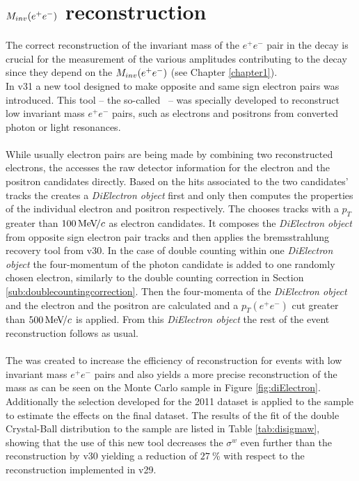 \section{$M_{inv}(e^+e^-)$ reconstruction}
\label{sec:DiElectronMaker}
The correct reconstruction of the invariant mass of the $e^+ e^-$ pair in the \BdKstee decay is crucial for the measurement of the various amplitudes contributing to the decay since they depend on the $M_{inv}(e^+e^-)$ (see Chapter \ref{chapter1}).\\
In \davinci v31 a new tool designed to make opposite and same sign electron pairs was introduced. This tool -- the so-called \dielectronmaker  \ -- was specially developed to reconstruct low invariant mass $e^+ e^-$ pairs, such as electrons and positrons from converted photon or light resonances.\\
\\
While usually electron pairs are being made by combining two reconstructed electrons, the \dielectronmaker accesses the raw detector information for the electron and the positron candidates directly. Based on the hits associated to the two candidates' tracks the \dielectronmaker creates a \textit{DiElectron object} first and only then computes the properties of the individual electron and positron respectively. The \dielectronmaker chooses tracks with a $p_T$ greater than $100 {\mathrm{\,Me\kern -0.1em V\!/}c}$ as electron candidates. It composes the \textit{DiElectron object} from opposite sign electron pair tracks and then applies the bremsstrahlung recovery tool from \davinci v30. In the case of double counting within one \textit{DiElectron object} the four-momentum of the photon candidate is added to one randomly chosen electron, similarly to the double counting correction in Section \ref{sub:doublecountingcorrection}. Then the four-momenta of the \textit{DiElectron object} and the electron and the positron are calculated and a $p_T(e^+ e^-)$ cut greater than $500 {\mathrm{\,Me\kern -0.1em V\!/}c}$ is applied.
From this \textit{DiElectron object} the rest of the event reconstruction follows as usual.\\
\\
The \dielectronmaker was created to increase the efficiency of reconstruction for events with low invariant mass $e^+ e^-$ pairs and also yields a more precise reconstruction of the \Bd mass as can be seen on the Monte Carlo sample in Figure \ref{fig:diElectron}. Additionally the selection developed for the 2011 dataset \cite{michellesthesis} is applied to the sample to estimate the effects on the final dataset. The results of the fit of the double Crystal-Ball distribution to the sample are listed in Table \ref{tab:disigmaw}, showing that the use of this new tool decreases the $\sigma^w$ even further than the reconstruction by \davinci v30  yielding a reduction of $27 \ $\% with respect to the reconstruction implemented in \davinci v29.
